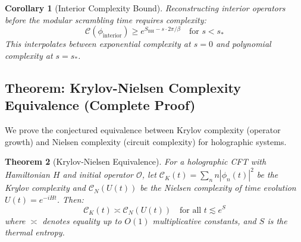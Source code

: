 \documentclass[12pt,a4paper]{article}
\newtheorem{theorem}{Theorem}[section]
\newtheorem{corollary}[theorem]{Corollary}
\begin{document}
\begin{corollary}[Interior Complexity Bound]
Reconstructing interior operators before the modular scrambling time requires complexity:
\begin{equation}
\mathcal{C}(\phi_{\text{interior}}) \geq e^{S_{\text{BH}} - s \cdot 2\pi/\beta} \quad \text{for } s < s_*
\end{equation}
This interpolates between exponential complexity at $s = 0$ and polynomial complexity at $s = s_*$.
\end{corollary}

\subsection{Theorem: Krylov-Nielsen Complexity Equivalence (Complete Proof)}

We prove the conjectured equivalence between Krylov complexity (operator growth) and Nielsen complexity (circuit complexity) for holographic systems.

\begin{theorem}[Krylov-Nielsen Equivalence]\label{thm:krylov-nielsen}
For a holographic CFT with Hamiltonian $H$ and initial operator $\mathcal{O}$, let $\mathcal{C}_K(t) = \sum_n n |\phi_n(t)|^2$ be the Krylov complexity and $\mathcal{C}_N(U(t))$ be the Nielsen complexity of time evolution $U(t) = e^{-iHt}$. Then:
\begin{equation}
\mathcal{C}_K(t) \asymp \mathcal{C}_N(U(t)) \quad \text{for all } t \lesssim e^{S}
\end{equation}
where $\asymp$ denotes equality up to $O(1)$ multiplicative constants, and $S$ is the thermal entropy.
\end{theorem}
\end{document}
